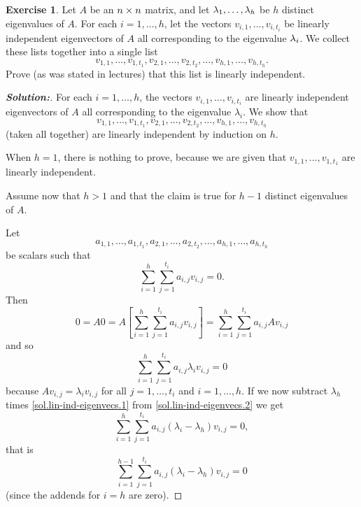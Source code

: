 \documentclass[a4paper]{amsart}
\theoremstyle{definition}
\newtheorem{exercise}{Exercise}
\newenvironment{solution}{\begin{proof}[\textbf{Solution:}] \vphantom{u}}{\end{proof}}
\begin{document}
\begin{exercise}\label{ex-evectors-independent}
 Let $A$ be an $n\times n$ matrix, and let $\lambda_1,\dotsc,\lambda_h$ be $h$ distinct
 eigenvalues of $A$.   For each $i=1,\dotsc,h$, let the vectors
 $v_{i,1},\dotsc,v_{i,t_i}$ be linearly independent eigenvectors of
 $A$ all corresponding to the eigenvalue $\lambda_i$.  We collect these
 lists together into a single list 
 \[ v_{1,1},\dotsc,v_{1,t_1},
    v_{2,1},\dotsc,v_{2,t_2},\dotsc,
    v_{h,1},\dotsc,v_{h,t_h}.
 \]
 Prove (as was stated in lectures) that this list is linearly independent.
\end{exercise}
\begin{solution}
 For each $i = 1, \ldots, h$, the vectors $v_{i,1}, \ldots,
 v_{i,t_i}$ are linearly independent eigenvectors of $A$ all
 corresponding to the eigenvalue
 $\lambda_i$. We show that
 $$
 v_{1,1}, \ldots, v_{1,t_1},
 v_{2,1}, \ldots, v_{2,t_2},
 \ldots,
 v_{h,1}, \ldots, v_{h,t_h}
 $$
 (taken all together) are linearly independent by induction on $h$.

 When $h = 1$, there is nothing to prove, because we are given that
 $v_{1,1}, \ldots, v_{1,t_1}$ are linearly independent.

 Assume now that $h>1$ and that the claim is true for $h-1$
 distinct eigenvalues of $A$.

 Let
 $$
 a_{1,1}, \ldots, a_{1,t_1},
 a_{2,1}, \ldots, a_{2,t_2},
 \ldots,
 a_{h,1}, \ldots, a_{h,t_h}
 $$
 be scalars such that
 \begin{equation}
 \sum_{i=1}^h \sum_{j=1}^{t_i} a_{i,j}v_{i,j} = 0.
 \label{sol.lin-ind-eigenvecs.1}
 \end{equation}
 Then
 $$
 0 = A0 = A\left[\sum_{i=1}^h \sum_{j=1}^{t_i} a_{i,j}v_{i,j}\right]
 = \sum_{i=1}^h \sum_{j=1}^{t_i} a_{i,j}Av_{i,j}$$
 and so
 \begin{equation}
 \sum_{i=1}^h \sum_{j=1}^{t_i} a_{i,j}\lambda_iv_{i,j} = 0
 \label{sol.lin-ind-eigenvecs.2}
 \end{equation}
 because $Av_{i,j} = \lambda_iv_{i,j}$ for all $j = 1, \ldots, t_i$ and
 $i = 1, \ldots, h$. If we
 now subtract $\lambda_h$ times \eqref{sol.lin-ind-eigenvecs.1} from
 \eqref{sol.lin-ind-eigenvecs.2} we get
 $$
 \sum_{i=1}^h \sum_{j=1}^{t_i} a_{i,j}(\lambda_i - \lambda_h)v_{i,j} = 0,
 $$
 that is
 $$
 \sum_{i=1}^{h-1} \sum_{j=1}^{t_i} a_{i,j}(\lambda_i - \lambda_h)v_{i,j} = 0
 $$
 (since the addends for $i=h$ are zero).


\end{solution}
\end{document}
